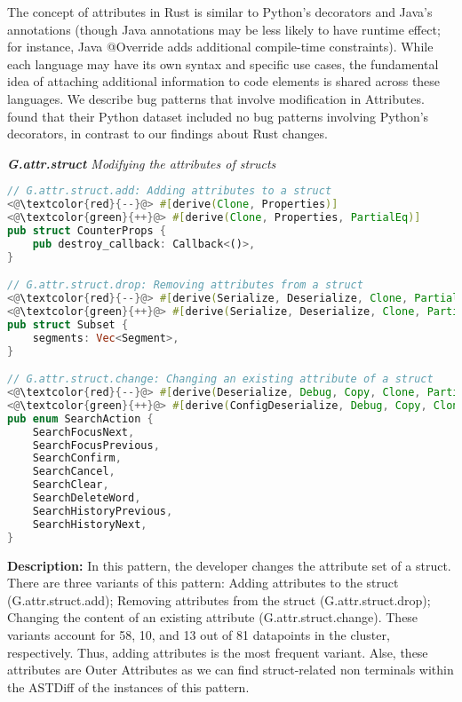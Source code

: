The concept of attributes in Rust is similar to Python's decorators and Java's annotations (though Java annotations may be less likely to have runtime effect; for instance, Java @Override adds additional compile-time constraints). While each language may have its own syntax and specific use cases, the fundamental idea of attaching additional information to code elements is shared across these languages. We describe bug patterns that involve modification in Attributes. \cite{yang2022mining} found that their Python dataset included no bug patterns involving Python's decorators, in contrast to our findings about Rust changes.

\noindent\textit{\label{sec:G.attr.struct}\textbf{G.attr.struct} Modifying the attributes of structs}

\begin{lstlisting}[language=Rust, style=colouredRust]
// G.attr.struct.add: Adding attributes to a struct
<@\textcolor{red}{--}@> #[derive(Clone, Properties)]
<@\textcolor{green}{++}@> #[derive(Clone, Properties, PartialEq)]
pub struct CounterProps {
    pub destroy_callback: Callback<()>,
}

// G.attr.struct.drop: Removing attributes from a struct
<@\textcolor{red}{--}@> #[derive(Serialize, Deserialize, Clone, PartialEq, Eq, Debug)]
<@\textcolor{green}{++}@> #[derive(Serialize, Deserialize, Clone, PartialEq, Eq)]
pub struct Subset {
    segments: Vec<Segment>,
}

// G.attr.struct.change: Changing an existing attribute of a struct
<@\textcolor{red}{--}@> #[derive(Deserialize, Debug, Copy, Clone, PartialEq, Eq)]
<@\textcolor{green}{++}@> #[derive(ConfigDeserialize, Debug, Copy, Clone, PartialEq, Eq)]
pub enum SearchAction {
    SearchFocusNext,
    SearchFocusPrevious,
    SearchConfirm,
    SearchCancel,
    SearchClear,
    SearchDeleteWord,
    SearchHistoryPrevious,
    SearchHistoryNext,
}
\end{lstlisting}

\noindent\textbf{Description:} In this pattern, the developer changes the attribute set of a struct. There are three variants of this pattern: Adding attributes to the struct (G.attr.struct.add); Removing attributes from the struct (G.attr.struct.drop); Changing the content of an existing attribute (G.attr.struct.change). These variants account for 58, 10, and 13 out of 81 datapoints in the cluster, respectively. Thus, adding attributes is the most frequent variant. Alse, these attributes are Outer Attributes as we can find struct-related non terminals within the ASTDiff of the instances of this pattern.

